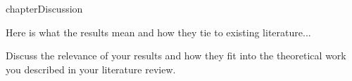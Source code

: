 chapter{Discussion}

Here is what the results mean and how they tie to existing literature...

Discuss the relevance of your results and how they fit into the theoretical work you described in your
literature review.
